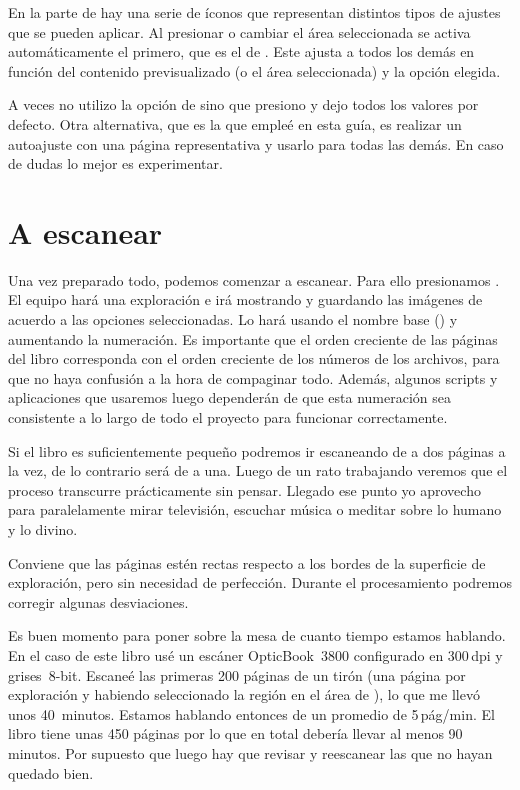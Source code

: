 \documentclass[%
	a5paper,
	10pt,
	twoside,
	openright,
	final,
]{memoir}
\begin{document}
{	En la parte de  hay una serie de íconos que representan distintos tipos de ajustes que se pueden aplicar. Al presionar  o cambiar el área seleccionada se activa automáticamente el primero, que es el de . Este ajusta a todos los demás en función del contenido previsualizado (o el área seleccionada) y la opción  elegida.

	A veces no utilizo la opción de  sino que presiono  y dejo todos los valores por defecto. Otra alternativa, que es la que empleé en esta guía, es realizar un autoajuste con una página representativa y usarlo para todas las demás. En caso de dudas lo mejor es experimentar.

	\section{A escanear} Una vez preparado todo, podemos comenzar a escanear. Para ello presionamos . El equipo hará una exploración e \irfanview irá mostrando y guardando las imágenes de acuerdo a las opciones seleccionadas. Lo hará usando el nombre base () y aumentando la numeración. Es importante que el orden creciente de las páginas del libro corresponda con el orden creciente de los números de los archivos, para que no haya confusión a la hora de compaginar todo. Además, algunos scripts y aplicaciones que usaremos luego dependerán de que esta numeración sea consistente a lo largo de todo el proyecto para funcionar correctamente.

	Si el libro es suficientemente pequeño podremos ir escaneando de a dos páginas a la vez, de lo contrario será de a una. Luego de un rato trabajando veremos que el proceso transcurre prácticamente sin pensar. Llegado ese punto yo aprovecho para paralelamente mirar televisión, escuchar música o meditar sobre lo humano y lo divino.

	Conviene que las páginas estén rectas respecto a los bordes de la superficie de exploración, pero sin necesidad de perfección. Durante el procesamiento podremos corregir algunas desviaciones.

	Es buen momento para poner sobre la mesa de cuanto tiempo estamos hablando. En el caso de este libro usé un escáner OpticBook~3800 configurado en 300\,dpi y grises~8-bit. Escaneé las primeras 200 páginas de un tirón (una página por exploración y habiendo seleccionado la región en el área de ), lo que me llevó unos 40~minutos. Estamos hablando entonces de un promedio de 5\,pág/min. El libro tiene unas 450 páginas por lo que en total debería llevar al menos 90 minutos. Por supuesto que luego hay que revisar y reescanear las que no hayan quedado bien.

}
\end{document}
